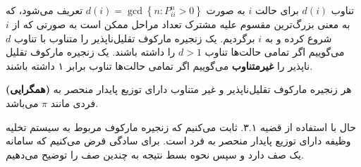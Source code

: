 \begin{defi}
تناوب $d(i)$ برای حالت $i$ به صورت $d(i)=\operatorname{gcd}\left\{n: P_{i i}^{n}>0\right\}$ تعریف می‌شود، که به معنی بزرگ‌ترین مقسوم علیه مشترک تعداد مراحل ممکن است به صورتی که از $i$ شروع کرده و به $i$ برگردیم. یک زنجیره مارکوف تقلیل‌ناپذیر را متناوب با تناوب $d$ می‌گوییم اگر تمامی حالت‌ها تناوب $d > 1$ را داشته باشند. یک زنجیره مارکوف تقلیل ناپذیر را \textbf{غیرمتناوب} می‌گوییم اگر تمامی حالت‌ها تناوب برابر ۱ داشته باشند.
\end{defi}
\begin{thm}
\textbf{(همگرایی)}
هر زنجیره مارکوف تقلیل‌ناپذیر و غیر متناوب دارای توزیع پایدار منحصر به فردی مانند $\pi$ می‌باشد.
\end{thm}
حال با استفاده از قضیه ۳.۱. ثابت می‌کنیم که زنجیره مارکوف مربوط به سیستم تخلیه وظیفه دارای توزیع پایدار منحصر به فرد است. برای سادگی فرض می‌کنیم که سامانه یک صف دارد و سپس نحوه بسط نتیجه به چندین صف را توضیح می‌دهیم.

